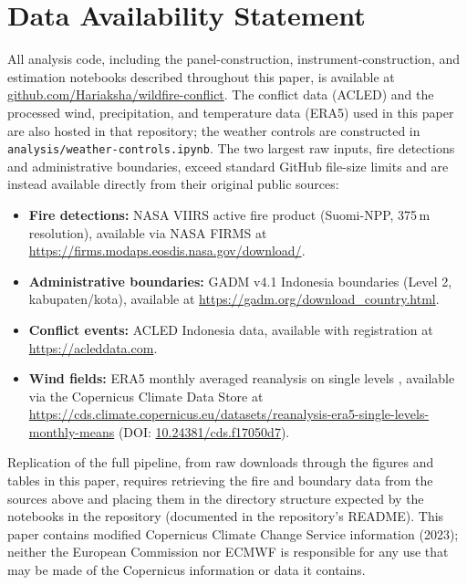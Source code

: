 \documentclass[12pt]{article}
\begin{document}
\section*{Data Availability Statement}

All analysis code, including the panel-construction, instrument-construction, and estimation notebooks described throughout this paper, is available at \href{https://github.com/Hariaksha/wildfire-conflict}{github.com/Hariaksha/wildfire-conflict}. The conflict data (ACLED) and the processed wind, precipitation, and temperature data (ERA5) used in this paper are also hosted in that repository; the weather controls are constructed in \texttt{analysis/weather-controls.ipynb}. The two largest raw inputs, fire detections and administrative boundaries, exceed standard GitHub file-size limits and are instead available directly from their original public sources:
\begin{itemize}
    \item \textbf{Fire detections:} NASA VIIRS active fire product (Suomi-NPP, 375\,m resolution), available via NASA FIRMS at \url{https://firms.modaps.eosdis.nasa.gov/download/}.
    \item \textbf{Administrative boundaries:} GADM v4.1 Indonesia boundaries (Level 2, kabupaten/kota), available at \url{https://gadm.org/download_country.html}.
    \item \textbf{Conflict events:} ACLED Indonesia data, available with registration at \url{https://acleddata.com}.
    \item \textbf{Wind fields:} ERA5 monthly averaged reanalysis on single levels \citep{hersbach2023era5}, available via the Copernicus Climate Data Store at \url{https://cds.climate.copernicus.eu/datasets/reanalysis-era5-single-levels-monthly-means} (DOI: \href{https://doi.org/10.24381/cds.f17050d7}{10.24381/cds.f17050d7}).
\end{itemize}
Replication of the full pipeline, from raw downloads through the figures and tables in this paper, requires retrieving the fire and boundary data from the sources above and placing them in the directory structure expected by the notebooks in the repository (documented in the repository's README). This paper contains modified Copernicus Climate Change Service information (2023); neither the European Commission nor ECMWF is responsible for any use that may be made of the Copernicus information or data it contains.

\clearpage
\appendix
\renewcommand{\thetable}{A\arabic{table}}
\setcounter{table}{0}
\renewcommand{\thefigure}{A\arabic{figure}}
\setcounter{figure}{0}
\end{document}

